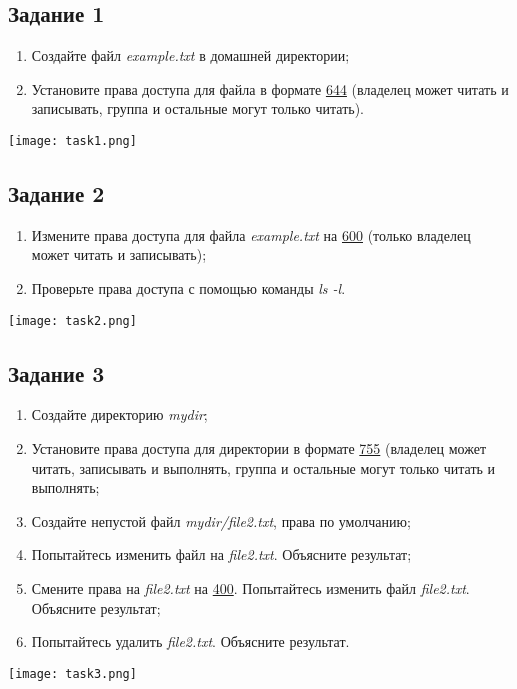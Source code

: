 \documentclass[12pt, a4paper]{report}
\begin{document}
	\subsection*{Задание 1}
	\begin{enumerate}
		\item Создайте файл \textit{example.txt} в домашней директории;
		\item Установите права доступа для файла в формате \underline{644} (владелец может читать и записывать, группа и остальные могут только читать).
	\end{enumerate}
	\lstset{style=mystyle}
	
	\begin{center}
		\texttt{[image: task1.png]}
	\end{center}

	\subsection*{Задание 2}
	\begin{enumerate}
		\item Измените права доступа для файла \textit{example.txt} на \underline{600} (только владелец может читать и записывать);
		\item Проверьте права доступа с помощью команды \textit{ls -l}.
	\end{enumerate}
	\lstset{style=mystyle}
	
	\begin{center}
		\texttt{[image: task2.png]}
	\end{center}

	\subsection*{Задание 3}
	\begin{enumerate}
		\item Создайте директорию \textit{mydir};
		\item Установите права доступа для директории в формате \underline{755} (владелец может читать, записывать и выполнять, группа и остальные могут только читать и выполнять;
		\item Создайте непустой файл \textit{mydir/file2.txt}, права по умолчанию;
		\item Попытайтесь изменить файл на \textit{file2.txt}. Объясните результат;
		\item Смените права на \textit{file2.txt} на \underline{400}. Попытайтесь изменить файл \textit{file2.txt}. Объясните результат;
		\item Попытайтесь удалить \textit{file2.txt}. Объясните результат.
	\end{enumerate}
	\lstset{style=mystyle}
	
	\begin{center}
		\texttt{[image: task3.png]}
	\end{center}
\end{document}

